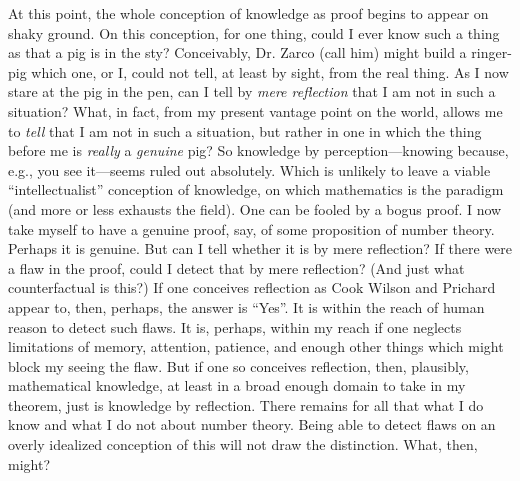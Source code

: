 At this point, the whole conception of knowledge as proof begins to appear on shaky ground. On this conception, for one thing, could I ever know such a thing as that a pig is in the sty? Conceivably, Dr. Zarco (call him) might build a ringer-pig which one, or I, could not tell, at least by sight, from the real thing. As I now stare at the pig in the pen, can I tell by \emph{mere reflection} that I am not in such a situation? What, in fact, from my present vantage point on the world, allows me to \emph{tell} that I am not in such a situation, but rather in one in which the thing before me is \emph{really} a \emph{genuine} pig? So knowledge by perception---knowing because, e.g., you see it---seems ruled out absolutely. Which is unlikely to leave a viable ``intellectualist'' conception of knowledge, on which mathematics is the paradigm (and more or less exhausts the field). One can be fooled by a bogus proof. I now take myself to have a genuine proof, say, of some proposition of number theory. Perhaps it is genuine. But can I tell whether it is by mere reflection? If there were a flaw in the proof, could I detect that by mere reflection? (And just what counterfactual is this?) If one conceives reflection as Cook Wilson and Prichard appear to, then, perhaps, the answer is ``Yes''. It is within the reach of human reason to detect such flaws. It is, perhaps, within my reach if one neglects limitations of memory, attention, patience, and enough other things which might block my seeing the flaw. But if one so conceives reflection, then, plausibly, mathematical knowledge, at least in a broad enough domain to take in my theorem, just is knowledge by reflection. There remains for all that what I do know and what I do not about number theory. Being able to detect flaws on an overly idealized conception of this will not draw the distinction. What, then, might?

